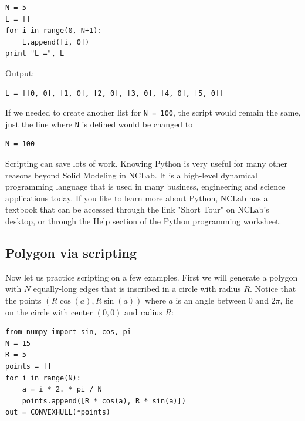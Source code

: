 \begin{bbox}
\begin{verbatim}
N = 5
L = []
for i in range(0, N+1):
    L.append([i, 0])
print "L =", L
\end{verbatim}
\end{bbox}
\vspace{6mm}

\noindent
Output:\\
\begin{ybox}
\begin{verbatim}
L = [[0, 0], [1, 0], [2, 0], [3, 0], [4, 0], [5, 0]]
\end{verbatim}
\end{ybox}
\vspace{6mm}

\noindent
If we needed to create another list for {\tt N = 100}, the script would remain the same,
just the line where {\tt N} is defined would be changed to \\

\begin{bbox}
\begin{verbatim}
N = 100
\end{verbatim}
\end{bbox}
\vspace{6mm}

\noindent
Scripting can save lots of work. Knowing Python is very useful for many other
reasons beyond Solid Modeling in NCLab. It is a high-level dynamical programming 
language that is used in many business, engineering and science applications 
today. If you like to learn more about Python, NCLab has a textbook that can be 
accessed through the link "Short Tour" on NCLab's desktop, or through the Help
section of the Python programming worksheet. 

\subsection{Polygon via scripting}\label{subsec:polygon}

Now let us practice scripting on a few examples.
First we will generate a polygon with $N$ equally-long 
edges that is inscribed in 
a circle with radius $R$. Notice that the points
$(R  \cos(a), R  \sin(a))$ where $a$ is an angle between 
$0$ and $2\pi$, lie on the circle with center $(0, 0)$ and 
radius $R$:\\

\begin{bbox}
\begin{verbatim}
from numpy import sin, cos, pi
N = 15
R = 5
points = []
for i in range(N):
    a = i * 2. * pi / N
    points.append([R * cos(a), R * sin(a)])
out = CONVEXHULL(*points)
\end{verbatim}
\end{bbox}

